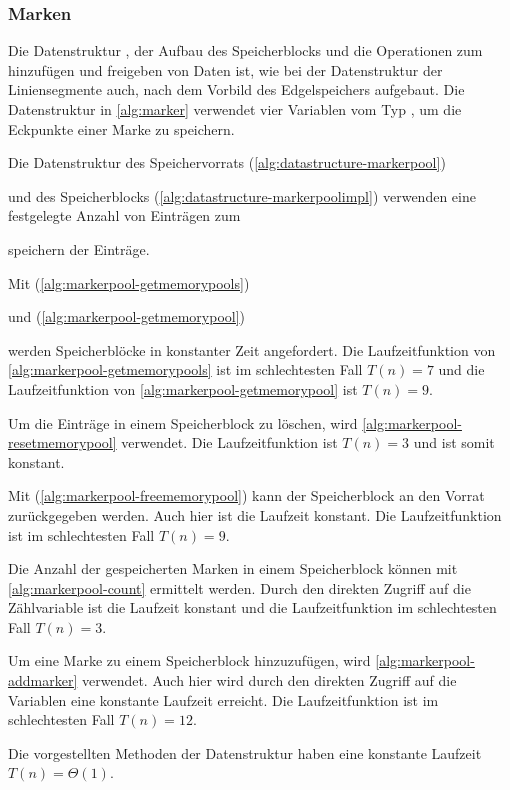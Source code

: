 \subsubsection{Marken} %
\label{sub:marken}

Die Datenstruktur , der Aufbau des Speicherblocks und die Operationen zum hinzufügen und freigeben von
 Daten ist, wie bei der Datenstruktur der Liniensegmente auch, nach dem Vorbild des Edgelspeichers aufgebaut. Die
 Datenstruktur in \autoref{alg:marker} verwendet vier Variablen vom Typ , um die Eckpunkte einer Marke
 zu speichern.


Die Datenstruktur des Speichervorrats (\autoref{alg:datastructure-markerpool})

und des Speicherblocks (\autoref{alg:datastructure-markerpoolimpl}) verwenden eine festgelegte Anzahl von Einträgen zum

speichern der Einträge.

Mit  (\autoref{alg:markerpool-getmemorypools})

und  (\autoref{alg:markerpool-getmemorypool})

werden Speicherblöcke in konstanter Zeit angefordert. Die Laufzeitfunktion von \autoref{alg:markerpool-getmemorypools}
 ist im schlechtesten Fall $T(n) = 7$ und die Laufzeitfunktion von \autoref{alg:markerpool-getmemorypool} ist
 $T(n) = 9$.

Um die Einträge in einem Speicherblock zu löschen, wird \autoref{alg:markerpool-resetmemorypool} verwendet. Die
 Laufzeitfunktion ist $T(n) = 3$ und ist somit konstant.


Mit  (\autoref{alg:markerpool-freememorypool}) kann der Speicherblock an den Vorrat
 zurückgegeben werden. Auch hier ist die Laufzeit konstant. Die Laufzeitfunktion ist im schlechtesten Fall $T(n) = 9$.


Die Anzahl der gespeicherten Marken in einem Speicherblock können mit \autoref{alg:markerpool-count} ermittelt werden.
 Durch den direkten Zugriff auf die Zählvariable ist die Laufzeit konstant und die Laufzeitfunktion im schlechtesten
 Fall $T(n) = 3$.


Um eine Marke zu einem Speicherblock hinzuzufügen, wird \autoref{alg:markerpool-addmarker} verwendet. Auch hier wird
 durch den direkten Zugriff auf die Variablen eine konstante Laufzeit erreicht. Die Laufzeitfunktion ist im
 schlechtesten Fall $T(n) = 12$.


Die vorgestellten Methoden der Datenstruktur  haben eine konstante Laufzeit $T(n)=\Theta(1)$.
